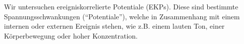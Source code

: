 \documentclass[10pt]{article}
\newcommand{\fig}[1]{\centering #1}
\begin{document}
Wir untersuchen ereigniskorrelierte Potentiale (EKPs). 
Diese sind bestimmte Spannungsschwankungen (\enquote{Potentiale}), welche in Zusammenhang mit einem internen oder externen Ereignis stehen, wie z.B. einem lauten Ton, einer Körperbewegung oder hoher Konzentration.  %







\end{document}
